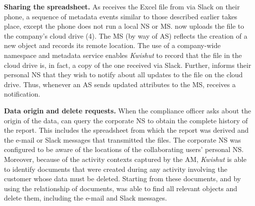 
\noindent\textbf{Sharing the spreadsheet.}
As \persc  receives the Excel file from \persa via Slack on their phone, a
sequence of metadata events similar to those described earlier takes place,
except the phone does not run a local NS or MS. \persc now uploads the file to
the company's cloud drive (4). The MS (by way of AS) reflects the creation of a
new object and records its remote location. The use of a company-wide namespace
and metadata service enables \emph{Kwishut} to record that the file in the cloud drive
is, in fact, a copy of the one received via Slack.  Further, \persc informs
their personal NS that they wish to notify \persa about all updates to the file
on the cloud drive. Thus, whenever an AS sends updated attributes to the MS,
\persc receives a notification.


\noindent\textbf{Data origin and delete requests.}
When the compliance officer asks about the origin of the data, \persc can query
the corporate NS to obtain the complete history of the report. This includes the
spreadsheet from which the report was derived and the e-mail or Slack messages
that transmitted the files.
The corporate NS was configured to be aware of the locations of the
collaborating users' personal NS. Moreover, because of the activity contexts
captured by the AM, \emph{Kwishut} is able to identify documents that were created
during any activity involving the customer whose data must be deleted. Starting
from these documents, and by using the relationship of documents, \persb was
able to find all relevant objects and delete them, including the e-mail and
Slack messages.


